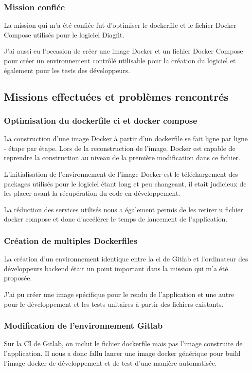 \subsubsection{Mission confiée}
La mission qui m'a été confiée fut d'optimiser le dockerfile et le fichier Docker Compose utilisés pour le logiciel Diagfit.

J'ai aussi eu l'occasion de créer une image Docker et un fichier Docker Compose pour créer un environnement contrôlé utilisable pour la création du logiciel et également pour les tests des développeurs.

\subsection{Missions effectuées et problèmes rencontrés}
\subsubsection{Optimisation du dockerfile ci et docker compose}
La construction d'une image Docker à partir d'un dockerfile se fait ligne par ligne - étape par étape.
Lors de la reconstruction de l'image, Docker est capable de reprendre la construction au niveau de la première modification dans ce fichier.

L'initialisation de l'environnement de l'image Docker est le téléchargement des packages utilisés pour le logiciel étant long et peu changeant, il etait judicieux de les placer avant la récupération du code en développement.

La réduction des services utilisés nous a également permis de les retirer u fichier docker compose et donc d'accélérer le temps de lancement de l'application.

\subsubsection{Création de multiples Dockerfiles}
La création d'un environnement identique entre la ci de Gitlab et l'ordinateur des développeurs backend était un point important dans la mission qui m'a été proposée.

J'ai pu créer une image spécifique pour le rendu de l'application et une autre pour le développement et les tests unitaires à partir des fichiers existants.

\subsubsection{Modification de l'environnement Gitlab}
Sur la CI de Gitlab, on inclut le fichier dockerfile mais pas l'image construite de l'application.
Il nous a donc fallu lancer une image docker générique pour build l'image docker de développement et de test d'une manière automatisée.

